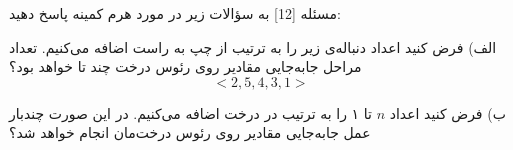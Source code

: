 ‌مسئله [12]
به سؤالات زیر در مورد هرم کمینه پاسخ دهید:

الف) فرض کنید اعداد دنباله‌ی زیر را به ترتیب از چپ به راست اضافه می‌کنیم. تعداد مراحل جابه‌جایی مقادیر روی رئوس درخت چند تا خواهد بود؟
$$<2, 5, 4, 3, 1>$$

ب)‌ فرض کنید اعداد $n$ تا ۱ را به ترتیب در درخت اضافه می‌کنیم. در این صورت چند‌بار عمل جابه‌جایی مقادیر روی رئوس درخت‌مان انجام خواهد شد؟



% 
%
%
% 

